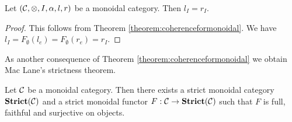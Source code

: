 \begin{corollary}\label{corollary:unitsareequalonunit}
Let $({\mathcal C},\otimes, I,\alpha, l, r)$ be a monoidal category. Then $l_I = r_I$.
\end{corollary}
\begin{proof}
This follows from Theorem \ref{theorem:coherenceformonoidal}. We have $l_I=F_\emptyset(l_e) = F_\emptyset(r_e)=r_I$.  
\end{proof}
\noindent
As another consequence of Theorem \ref{theorem:coherenceformonoidal} we obtain Mac Lane's strictness theorem.

\begin{theorem}\label{theorem:strictnesstheorem}
Let ${\mathcal C}$ be a monoidal category. Then there exists a strict monoidal category $\mathbf{Strict}({\mathcal C})$ and a strict monoidal functor $F:{\mathcal C}\rightarrow \mathbf{Strict}({\mathcal C})$ such that $F$ is full, faithful and surjective on objects.
\end{theorem}

